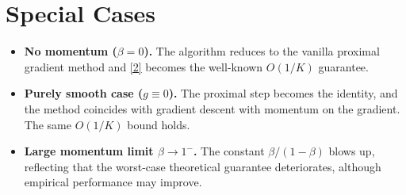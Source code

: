 \documentclass{article}
\begin{document}
\section*{Special Cases}
\begin{itemize}
\item \textbf{No momentum ($\beta=0$).} The algorithm reduces to the vanilla proximal gradient method and \eqref{2} becomes the well‑known $O(1/K)$ guarantee.
\item \textbf{Purely smooth case ($g\equiv0$).} The proximal step becomes the identity, and the method coincides with gradient descent with momentum on the gradient. The same $O(1/K)$ bound holds.
\item \textbf{Large momentum limit $\beta\to 1^{-}$.} The constant $\beta/(1-\beta)$ blows up, reflecting that the worst‑case theoretical guarantee deteriorates, although empirical performance may improve.
\end{itemize}
\end{document}
